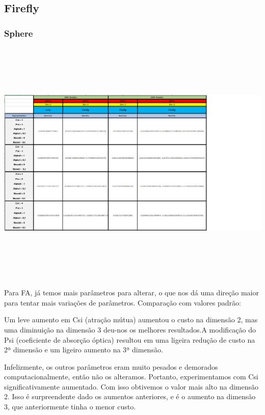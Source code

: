 \documentclass[10pt]{article}
\begin{document}
\subsection{Firefly}\label{sec:fire-res}
\subsubsection{Sphere}\label{sec:fire-sphere}
\begin{center}
  \includegraphics[height=12cm]{img/Fireflysphere.png}
\end{center}
Para FA, já temos mais parâmetros para alterar, o que nos dá uma 
direção maior  para tentar mais variações de parâmetros. Comparação
com  valores padrão:

Um leve aumento em Csi (atração mútua) aumentou o custo na 
dimensão 2, mas uma diminuição na dimensão 3 deu-nos os melhores 
resultados.A modificação do Psi (coeficiente de absorção óptica) 
resultou em uma ligeira redução de custo na 2ª dimensão e um 
ligeiro aumento na 3ª dimensão.


Infelizmente, os outros parâmetros eram muito pesados 
e demorados computacionalmente, então não os alteramos. 
Portanto, experimentamos com Csi significativamente aumentado. 
Com isso obtivemos o  valor mais alto na dimensão 2. 
Isso é surpreendente dado os aumentos anteriores, e é o 
aumento na dimensão 3, que anteriormente tinha o menor custo.
\end{document}
